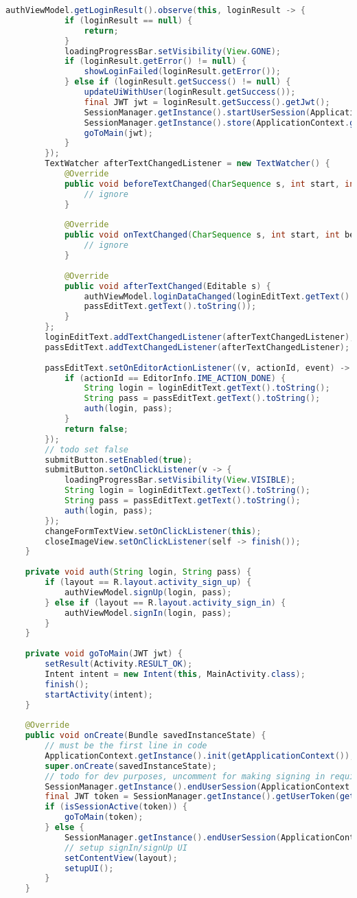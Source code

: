 \begin{lstlisting}[language=Java]
		authViewModel.getLoginResult().observe(this, loginResult -> {
			if (loginResult == null) {
				return;
			}
			loadingProgressBar.setVisibility(View.GONE);
			if (loginResult.getError() != null) {
				showLoginFailed(loginResult.getError());
			} else if (loginResult.getSuccess() != null) {
				updateUiWithUser(loginResult.getSuccess());
				final JWT jwt = loginResult.getSuccess().getJwt();
				SessionManager.getInstance().startUserSession(ApplicationContext.get(), jwt);
				SessionManager.getInstance().store(ApplicationContext.get(), MEMBER_AVATAR_STORED_KEY, loginResult.getSuccess().getAvatar());
				goToMain(jwt);
			}
		});
		TextWatcher afterTextChangedListener = new TextWatcher() {
			@Override
			public void beforeTextChanged(CharSequence s, int start, int count, int after) {
				// ignore
			}
			
			@Override
			public void onTextChanged(CharSequence s, int start, int before, int count) {
				// ignore
			}
			
			@Override
			public void afterTextChanged(Editable s) {
				authViewModel.loginDataChanged(loginEditText.getText().toString(),
				passEditText.getText().toString());
			}
		};
		loginEditText.addTextChangedListener(afterTextChangedListener);
		passEditText.addTextChangedListener(afterTextChangedListener);
		
		passEditText.setOnEditorActionListener((v, actionId, event) -> {
			if (actionId == EditorInfo.IME_ACTION_DONE) {
				String login = loginEditText.getText().toString();
				String pass = passEditText.getText().toString();
				auth(login, pass);
			}
			return false;
		});
		// todo set false
		submitButton.setEnabled(true);
		submitButton.setOnClickListener(v -> {
			loadingProgressBar.setVisibility(View.VISIBLE);
			String login = loginEditText.getText().toString();
			String pass = passEditText.getText().toString();
			auth(login, pass);
		});
		changeFormTextView.setOnClickListener(this);
		closeImageView.setOnClickListener(self -> finish());
	}
	
	private void auth(String login, String pass) {
		if (layout == R.layout.activity_sign_up) {
			authViewModel.signUp(login, pass);
		} else if (layout == R.layout.activity_sign_in) {
			authViewModel.signIn(login, pass);
		}
	}
	
	private void goToMain(JWT jwt) {
		setResult(Activity.RESULT_OK);
		Intent intent = new Intent(this, MainActivity.class);
		finish();
		startActivity(intent);
	}
	
	@Override
	public void onCreate(Bundle savedInstanceState) {
		// must be the first line in code
		ApplicationContext.getInstance().init(getApplicationContext());
		super.onCreate(savedInstanceState);
		// todo for dev purposes, uncomment for making signing in required all the time as token get cleaned
		SessionManager.getInstance().endUserSession(ApplicationContext.get());
		final JWT token = SessionManager.getInstance().getUserToken(getApplicationContext()).orElse(null);
		if (isSessionActive(token)) {
			goToMain(token);
		} else {
			SessionManager.getInstance().endUserSession(ApplicationContext.get());
			// setup signIn/signUp UI
			setContentView(layout);
			setupUI();
		}
	}
	

\end{lstlisting}
